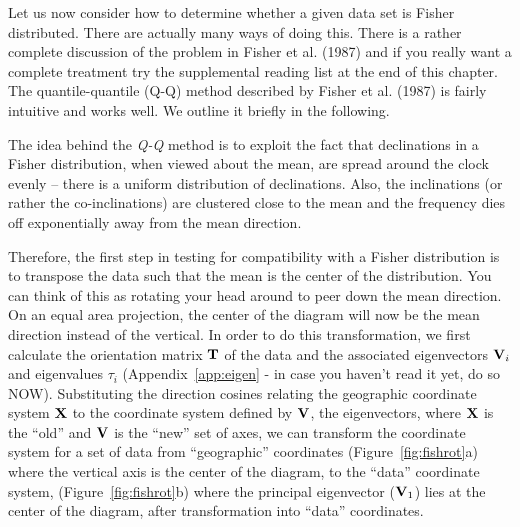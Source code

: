 %
Let us now consider how to determine whether a given data set is Fisher
distributed.  
There are actually many ways of doing this.    There is a rather complete discussion
of  the problem in Fisher et al. (1987) and if you really want a complete treatment try the supplemental reading list at the end of this chapter.
The quantile-quantile (Q-Q) method described by Fisher et al. (1987) is fairly intuitive and works well.  We outline it briefly in the following. 


The idea behind the  {\it Q-Q}  method is to exploit the fact that declinations
in a Fisher distribution, when viewed about the mean, are spread around
the clock evenly -- there is  a uniform distribution of declinations.
Also, the inclinations (or rather the co-inclinations) are clustered
close to the mean and the frequency dies off exponentially away from the mean
direction.  

Therefore,
 the first  step  in testing for compatibility with a Fisher distribution is to transpose the data
such that the mean is the center of the distribution.  You can think
of this as rotating your head around to peer down the mean direction.
On an equal area projection, the center of the diagram will now be  the mean direction instead of the vertical.
In order to do this transformation, we first  
calculate the orientation matrix $\hbox{\bf T}$ of
the data and  the associated eigenvectors $\hbox{\bf V}_i$ and eigenvalues $\tau_i$
(Appendix~\ref{app:eigen} - in case you haven't read it yet, do so NOW). 
Substituting the direction cosines relating the geographic coordinate
system $\hbox{\bf X}$ to the coordinate system defined by $\hbox{\bf V}$, the eigenvectors, 
where $\hbox{\bf X}$ is the ``old'' and $\hbox{\bf V}$ is the ``new''
set of axes, we can transform the
coordinate system for a set of data from ``geographic'' coordinates
 (Figure~\ref{fig:fishrot}a) where the vertical axis is the center
of the diagram, to  the ``data'' coordinate system,
 (Figure~\ref{fig:fishrot}b)
where the principal eigenvector ($\hbox{\bf V}_1$) lies at the center of the
diagram, after transformation into ``data'' coordinates.  




